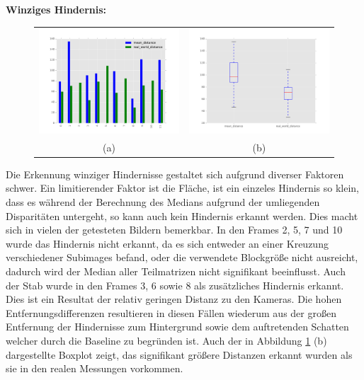	\noindent
	\textbf{Winziges Hindernis:}\\
	\begin{figure}[h]
		\centering
		\begin{tabular}{cc}
		\includegraphics[width=7cm]{img/evaluation/sub_tiny_bar}&
		\includegraphics[width=7cm]{img/evaluation/sub_tiny_box}\\
		(a)	& (b)
		\end{tabular}
	    \caption{}
	    \label{fig:eval_tiny}
	\end{figure}
	
	\noindent
	Die Erkennung winziger Hindernisse gestaltet sich aufgrund diverser Faktoren schwer. Ein limitierender Faktor ist die Fläche, ist ein einzeles Hindernis so klein, dass es während der Berechnung des Medians aufgrund der umliegenden Disparitäten untergeht, so kann auch kein Hindernis erkannt werden. Dies macht sich in vielen der getesteten Bildern bemerkbar. In den Frames 2, 5, 7 und 10 wurde das Hindernis nicht erkannt, da es sich entweder an einer Kreuzung verschiedener Subimages befand, oder die verwendete Blockgröße nicht ausreicht, dadurch wird der Median aller Teilmatrizen nicht signifikant beeinflusst. Auch der Stab wurde in den Frames 3, 6 sowie 8 als zusätzliches Hindernis erkannt. Dies ist ein Resultat der relativ geringen Distanz zu den Kameras. Die hohen Entfernungsdifferenzen resultieren in diesen Fällen wiederum aus der großen Entfernung der Hindernisse zum Hintergrund sowie dem auftretenden Schatten welcher durch die Baseline zu begründen ist. Auch der in Abbildung \ref{fig:eval_tiny} (b) dargestellte Boxplot zeigt, das signifikant größere Distanzen erkannt wurden als sie in den realen Messungen vorkommen.

